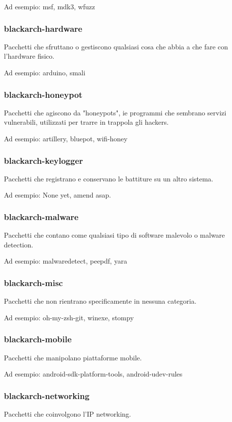 \documentclass[a4paper, oneside, 11pt]{book}
\begin{document}
Ad esempio: msf, mdk3, wfuzz

\subsubsection{blackarch-hardware}
Pacchetti che sfruttano o gestiscono qualsiasi cosa che abbia a che fare con l'hardware fisico.

Ad esempio: arduino, smali

\subsubsection{blackarch-honeypot}
Pacchetti che agiscono da "honeypots", ie programmi che sembrano servizi vulnerabili, utilizzati per trarre in trappola gli hackers.

Ad esempio: artillery, bluepot, wifi-honey

\subsubsection{blackarch-keylogger}
Pacchetti che registrano e conservano le battiture su un altro sistema.

Ad esempio: None yet, amend asap.

\subsubsection{blackarch-malware}
Pacchetti che contano come qualsiasi tipo di software malevolo o malware detection.

Ad esempio: malwaredetect, peepdf, yara

\subsubsection{blackarch-misc}
Pacchetti che non rientrano specificamente in nessuna categoria.

Ad esempio: oh-my-zsh-git, winexe, stompy

\subsubsection{blackarch-mobile}
Pacchetti che manipolano piattaforme mobile.

Ad esempio: android-sdk-platform-tools, android-udev-rules

\subsubsection{blackarch-networking}
Pacchetti che coinvolgono l'IP networking.
\end{document}
